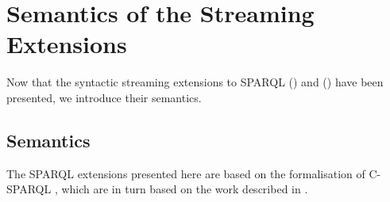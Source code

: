 \section{Semantics of the Streaming Extensions}
\label{semanticsstreaming}

Now that the syntactic streaming extensions to SPARQL \linebreak (\sparqlstr) and \rtwoo (\stwoo) have been presented, we
introduce their semantics.

\subsection{\sparqlstr Semantics}
\label{sparqlstrsemantics}

The SPARQL extensions presented here are based on the formalisation of  C-SPARQL \cite{Barbieri_2010}, which are in turn based on the work described in \cite{Perez_09}.
%

%
%


